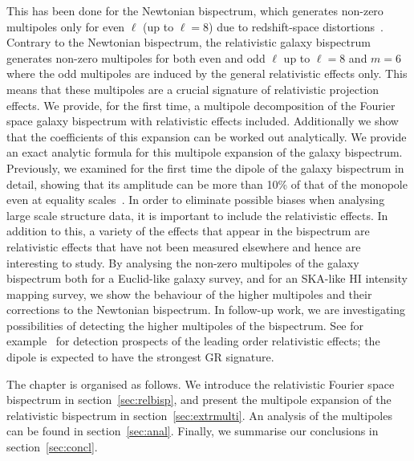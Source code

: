This has been done for the Newtonian bispectrum, which generates non-zero multipoles only for even 
\(\ell\) (up to \(\ell = 8\)) due to redshift-space distortions~\cite{Scoccimarro:1999ed,Nan:2017oaq}. Contrary to the Newtonian bispectrum, the relativistic galaxy bispectrum generates non-zero multipoles for both even and odd \(\ell\) up to \(\ell = 8\) and \(m = 6\) where the odd multipoles are induced by the general relativistic effects only. This means that these multipoles are a crucial signature of relativistic projection effects. We provide, for the first time, a multipole decomposition of the Fourier space galaxy bispectrum with relativistic effects included. Additionally we show that the coefficients of this expansion can be worked out analytically. We provide an exact analytic formula for this multipole expansion of the galaxy bispectrum. Previously, we examined for the first time the dipole of the galaxy bispectrum in detail, showing that its amplitude can be more than 10\% of that of the monopole even at equality scales~\cite{Clarkson:2018dwn}. 
In order to eliminate possible biases when analysing large scale structure data, it is important to include the relativistic effects. In addition to this, a variety of the effects that appear in the bispectrum are relativistic effects that have not been measured elsewhere and hence are interesting to study. By analysing the non-zero multipoles of the galaxy bispectrum both for a Euclid-like galaxy survey, and for an SKA-like HI intensity mapping survey, we show the behaviour of the higher multipoles and their corrections to the Newtonian bispectrum. In follow-up work, we are investigating possibilities of detecting the higher multipoles of the bispectrum. See for example~\cite{Maartens:2019yhx} for detection prospects of the leading order relativistic effects; the dipole is expected to have the strongest GR signature. 

The chapter is organised as follows. We introduce the relativistic Fourier space bispectrum in section~\ref{sec:relbisp}, and present the multipole expansion of the relativistic bispectrum in section~\ref{sec:extrmulti}. An analysis of the multipoles can be found in section~\ref{sec:anal}. Finally, we summarise our conclusions in section~\ref{sec:concl}.

